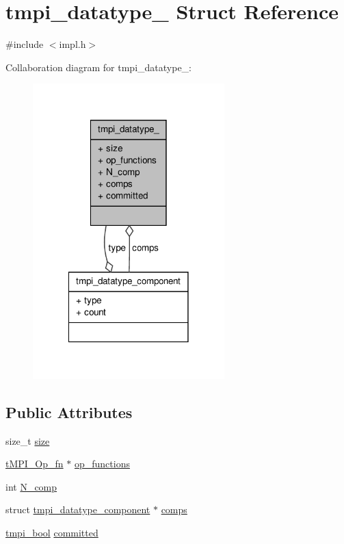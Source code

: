 \hypertarget{structtmpi__datatype__}{\section{tmpi\-\_\-datatype\-\_\- \-Struct \-Reference}
\label{structtmpi__datatype__}
}


{\ttfamily \#include $<$impl.\-h$>$}



\-Collaboration diagram for tmpi\-\_\-datatype\-\_\-\-:
\nopagebreak
\begin{figure}[H]
\begin{center}
\leavevmode
\includegraphics[width=210pt]{structtmpi__datatype____coll__graph}
\end{center}
\end{figure}
\subsection*{\-Public \-Attributes}
\begin{DoxyCompactItemize}
\item 
size\-\_\-t \hyperlink{structtmpi__datatype___ab262caa9036ae8a98b3ac73535b14fef}{size}
\item 
\hyperlink{impl_8h_ae88adc6f8a40e15030eb5720103b90cb}{t\-M\-P\-I\-\_\-\-Op\-\_\-fn} $\ast$ \hyperlink{structtmpi__datatype___a74948602e4ec1b81fcb5082c4e3c2bcc}{op\-\_\-functions}
\item 
int \hyperlink{structtmpi__datatype___a04426ad6c89fb0144b3e44cfa8b51052}{\-N\-\_\-comp}
\item 
struct \hyperlink{structtmpi__datatype__component}{tmpi\-\_\-datatype\-\_\-component} $\ast$ \hyperlink{structtmpi__datatype___aece2997dc2ee6ffcc727ee29a5266cf5}{comps}
\item 
\hyperlink{impl_8h_a1c904605658586a00645b5fc9f6b8479}{tmpi\-\_\-bool} \hyperlink{structtmpi__datatype___a0b8f7ca64dc30743c99d26f880be15d2}{committed}
\end{DoxyCompactItemize}



